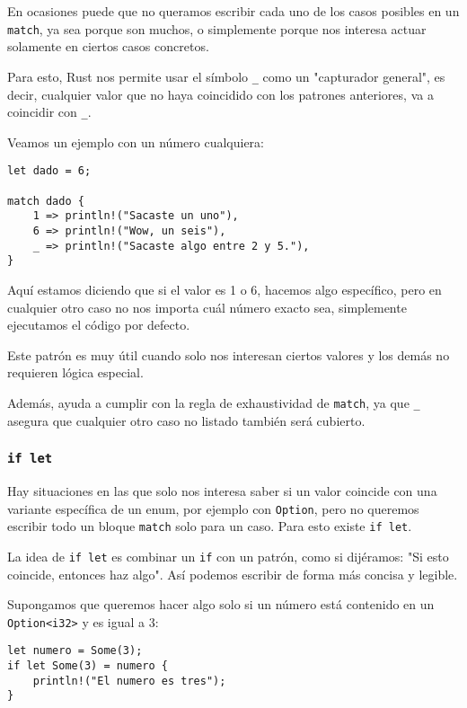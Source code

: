 \documentclass[12pt]{article}
\begin{document}
En ocasiones puede que no queramos escribir cada uno de los casos posibles en un \texttt{match}, ya sea porque son muchos, o simplemente porque nos interesa actuar solamente en ciertos casos concretos.

Para esto, Rust nos permite usar el símbolo \texttt{\_} como un "capturador general", es decir, cualquier valor que no haya coincidido con los patrones anteriores, va a coincidir con \texttt{\_}.

Veamos un ejemplo con un número cualquiera:

\begin{lstlisting}[style=ruststyle]
let dado = 6;
	
match dado {
	1 => println!("Sacaste un uno"),
	6 => println!("Wow, un seis"),
	_ => println!("Sacaste algo entre 2 y 5."),
}
\end{lstlisting}

Aquí estamos diciendo que si el valor es 1 o 6, hacemos algo específico, pero en cualquier otro caso no nos importa cuál número exacto sea, simplemente ejecutamos el código por defecto.

Este patrón es muy útil cuando solo nos interesan ciertos valores y los demás no requieren lógica especial.

Además, ayuda a cumplir con la regla de exhaustividad de \texttt{match}, ya que \texttt{\_} asegura que cualquier otro caso no listado también será cubierto.

\subsubsection{\texttt{if let}}

Hay situaciones en las que solo nos interesa saber si un valor coincide con una variante específica de un enum, por ejemplo con \texttt{Option}, pero no queremos escribir todo un bloque \texttt{match} solo para un caso. Para esto existe \texttt{if let}.

La idea de \texttt{if let} es combinar un \texttt{if} con un patrón, como si dijéramos: "Si esto coincide, entonces haz algo". Así podemos escribir de forma más concisa y legible.

Supongamos que queremos hacer algo solo si un número está contenido en un \texttt{Option<i32>} y es igual a 3:

\begin{lstlisting}[style=ruststyle]
let numero = Some(3);
if let Some(3) = numero {
	println!("El numero es tres");
}
\end{lstlisting}
\end{document}
